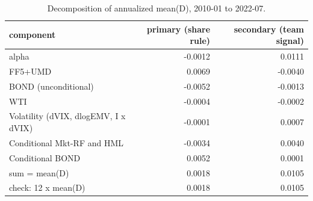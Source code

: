 \begin{table}[htbp]\centering\small
\caption{Decomposition of annualized mean(D), 2010-01 to 2022-07.}
\label{tab:m8_decomposition}
\begin{tabular}{lrr}
\toprule
component & primary (share rule) & secondary (team signal) \\
\midrule
alpha & -0.0012 & 0.0111 \\
FF5+UMD & 0.0069 & -0.0040 \\
BOND (unconditional) & -0.0052 & -0.0013 \\
WTI & -0.0004 & -0.0002 \\
Volatility (dVIX, dlogEMV, I x dVIX) & -0.0001 & 0.0007 \\
Conditional Mkt-RF and HML & -0.0034 & 0.0040 \\
Conditional BOND & 0.0052 & 0.0001 \\
sum = mean(D) & 0.0018 & 0.0105 \\
check: 12 x mean(D) & 0.0018 & 0.0105 \\
\bottomrule
\end{tabular}
\end{table}
